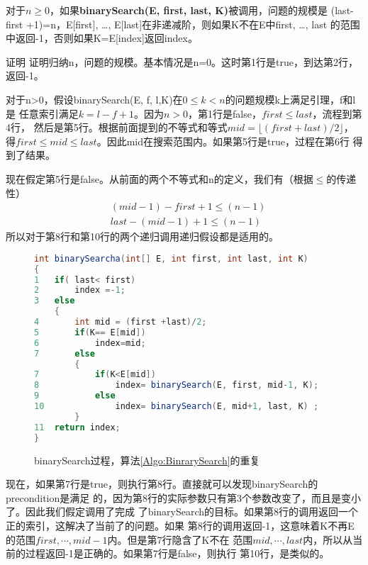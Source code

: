 \begin{lemma}
对于$n\geq 0$，如果\textbf{binarySearch(E, first, last, K)}被调用，问题的规模是
(last- first +1)=n，E[first], …, E[last]在非递减阶，则如果K不在E中first, …, last
的范围中返回-1，否则如果K=E[index]返回index。

证明  证明归纳n，问题的规模。基本情况是n=0。这时第1行是true，到达第2行，返回-1。

对于n>0，假设binarySearch(E, f, l,K)在$0\leq k <n$的问题规模k上满足引理，f和l是
任意索引满足$k=l-f+1$。因为$n>0$，第1行是false，$first \leq last$，流程到第4行，
然后是第5行。根据前面提到的不等式和等式$mid=\lfloor (first+last)/2\rfloor$，
得$first\leq mid \leq last$。因此mid在搜索范围内。如果第5行是true，过程在第6行
得到了结果。

现在假定第5行是false。从前面的两个不等式和n的定义，我们有（根据$\leq$的传递性）
\begin{displaymath}
\begin{aligned}
&(mid-1)-first+1 \leq (n-1)\\
&last-(mid-1)+1 \leq (n-1)
\end{aligned}
\end{displaymath}
所以对于第8行和第10行的两个递归调用递归假设都是适用的。

\begin{figure*}[!t]
    \centering
    \begin{lstlisting}[language={Java}, keywordstyle=\color{blue!70}, commentstyle=\color{red!50!green!50!blue!50}]
    int binarySearcha(int[] E, int first, int last, int K)
{
1   if( last< first)
2       index =-1;
3   else
    {
4       int mid = (first +last)/2;
5       if(K== E[mid])
6           index=mid;
7       else
        {
7           if(K<E[mid])
8               index= binarySearch(E, first, mid-1, K);
9           else
10              index= binarySearch(E, mid+1, last, K) ;
        }
11  return index;
}
    \end{lstlisting}
    \caption{binarySearch过程，算法\ref{Algo:BinrarySearch}的重复}
    \label{Fig:ProcedureforBinarySearch}
\end{figure*}

现在，如果第7行是true，则执行第8行。直接就可以发现binarySearch的precondition是满足
的，因为第8行的实际参数只有第3个参数改变了，而且是变小了。因此我们假定调用了完成
了binarySearch的目标。如果第8行的调用返回一个正的索引，这解决了当前了的问题。如果
第8行的调用返回-1，这意味着K不再E的范围$first, \cdots, mid-1$内。但是第7行隐含了K不在
范围$mid, \cdots, last$内，所以从当前的过程返回-1是正确的。如果第7行是false，则执行
第10行，是类似的。
\end{lemma}

